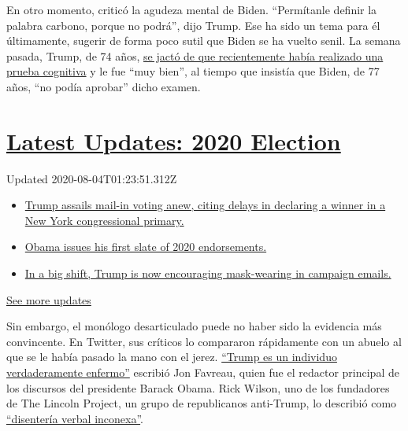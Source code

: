 En otro momento, criticó la agudeza mental de Biden. ``Permítanle
definir la palabra carbono, porque no podrá'', dijo Trump. Ese ha sido
un tema para él últimamente, sugerir de forma poco sutil que Biden se ha
vuelto senil. La semana pasada, Trump, de 74 años,
\href{https://www.nytimes.com/2020/07/10/us/politics/trump-cognitive-test-health.html}{se
jactó de que recientemente había realizado una prueba cognitiva} y le
fue ``muy bien'', al tiempo que insistía que Biden, de 77 años, ``no
podía aprobar'' dicho examen.

\hypertarget{latest-updates-2020-election}{%
\section{\texorpdfstring{\href{https://www.nytimes.com/2020/08/03/us/elections/biden-vs-trump.html?action=click\&pgtype=Article\&state=default\&region=MAIN_CONTENT_1\&context=storylines_live_updates}{Latest
Updates: 2020
Election}}{Latest Updates: 2020 Election}}\label{latest-updates-2020-election}}

Updated 2020-08-04T01:23:51.312Z

\begin{itemize}
\tightlist
\item
  \href{https://www.nytimes.com/2020/08/03/us/elections/biden-vs-trump.html?action=click\&pgtype=Article\&state=default\&region=MAIN_CONTENT_1\&context=storylines_live_updates\#link-6494b448}{Trump
  assails mail-in voting anew, citing delays in declaring a winner in a
  New York congressional primary.}
\item
  \href{https://www.nytimes.com/2020/08/03/us/elections/biden-vs-trump.html?action=click\&pgtype=Article\&state=default\&region=MAIN_CONTENT_1\&context=storylines_live_updates\#link-3de249e6}{Obama
  issues his first slate of 2020 endorsements.}
\item
  \href{https://www.nytimes.com/2020/08/03/us/elections/biden-vs-trump.html?action=click\&pgtype=Article\&state=default\&region=MAIN_CONTENT_1\&context=storylines_live_updates\#link-54e34d20}{In
  a big shift, Trump is now encouraging mask-wearing in campaign
  emails.}
\end{itemize}

\href{https://www.nytimes.com/2020/08/03/us/elections/biden-vs-trump.html?action=click\&pgtype=Article\&state=default\&region=MAIN_CONTENT_1\&context=storylines_live_updates}{See
more updates}

Sin embargo, el monólogo desarticulado puede no haber sido la evidencia
más convincente. En Twitter, sus críticos lo compararon rápidamente con
un abuelo al que se le había pasado la mano con el jerez.
\href{https://twitter.com/jonfavs/status/1283157746603356160}{``Trump es
un individuo verdaderamente enfermo''} escribió Jon Favreau, quien fue
el redactor principal de los discursos del presidente Barack Obama. Rick
Wilson, uno de los fundadores de The Lincoln Project, un grupo de
republicanos anti-Trump, lo describió como
\href{https://twitter.com/TheRickWilson/status/1283165162988621839}{``disentería
verbal inconexa''}.


